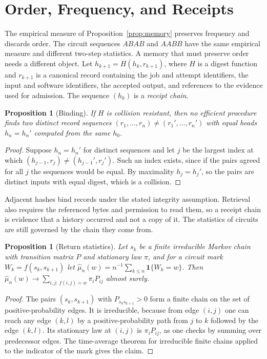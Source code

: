 \documentclass[11pt,openany]{book}
\theoremstyle{plain}
\newtheorem{proposition}[theorem]{Proposition}
\theoremstyle{definition}
\theoremstyle{remark}
\begin{document}
\section{Order, Frequency, and Receipts}

The empirical measure of Proposition~\ref{prop:memory} preserves frequency and discards order. The circuit sequences $ABAB$ and $AABB$ have the same empirical measure and different two-step statistics. A memory that must preserve order needs a different object. Let $h_{k+1}=H(h_k,r_{k+1})$, where $H$ is a digest function and $r_{k+1}$ is a canonical record containing the job and attempt identifiers, the input and software identifiers, the accepted output, and references to the evidence used for admission. The sequence $(h_k)$ is a \emph{receipt chain}.

\begin{proposition}[Binding]
\label{prop:binding}
If $H$ is collision resistant, then no efficient procedure finds two distinct record sequences $(r_1,\dots,r_n)\ne(r_1',\dots,r_n')$ with equal heads $h_n=h_n'$ computed from the same $h_0$.
\end{proposition}
\begin{proof}
Suppose $h_n=h_n'$ for distinct sequences and let $j$ be the largest index at which $(h_{j-1},r_j)\ne(h_{j-1}',r_j')$. Such an index exists, since if the pairs agreed for all $j$ the sequences would be equal. By maximality $h_j=h_j'$, so the pairs are distinct inputs with equal digest, which is a collision.
\end{proof}

Adjacent hashes bind records under the stated integrity assumption. Retrieval also requires the referenced bytes and permission to read them, so a receipt chain is evidence that a history occurred and not a copy of it. The statistics of circuits are still governed by the chain they come from.

\begin{proposition}[Return statistics]
\label{prop:edgefreq}
Let $s_k$ be a finite irreducible Markov chain with transition matrix $P$ and stationary law $\pi$, and for a circuit mark $W_k=f(s_k,s_{k+1})$ let $\widehat\mu_n(w)=n^{-1}\sum_{k\le n}\mathbf 1\{W_k=w\}$. Then $\widehat\mu_n(w)\to\sum_{i,j:\,f(i,j)=w}\pi_iP_{ij}$ almost surely.
\end{proposition}
\begin{proof}
The pairs $(s_k,s_{k+1})$ with $P_{s_ks_{k+1}}>0$ form a finite chain on the set of positive-probability edges. It is irreducible, because from edge $(i,j)$ one can reach any edge $(k,l)$ by a positive-probability path from $j$ to $k$ followed by the edge $(k,l)$. Its stationary law at $(i,j)$ is $\pi_iP_{ij}$, as one checks by summing over predecessor edges. The time-average theorem for irreducible finite chains applied to the indicator of the mark gives the claim.
\end{proof}
\end{document}

